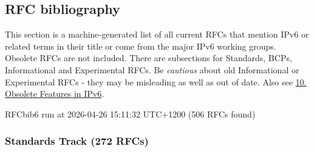 \documentclass[
]{article}
\begin{document}
\pagebreak

\subsection{RFC bibliography}\label{rfc-bibliography}

This section is a machine-generated list of all current RFCs that
mention IPv6 or related terms in their title or come from the major IPv6
working groups. Obsolete RFCs are not included. There are subsections
for Standards, BCPs, Informational and Experimental RFCs. Be
\emph{cautious} about old Informational or Experimental RFCs - they may
be misleading as well as out of date. Also see
\hyperref[obsolete-features-in-ipv6]{10. Obsolete Features in IPv6}.

RFCbib6 run at 2026-04-26 15:11:32 UTC+1200 (506 RFCs found)

\subsubsection{Standards Track (272
RFCs)}\label{standards-track-272-rfcs}
\end{document}
